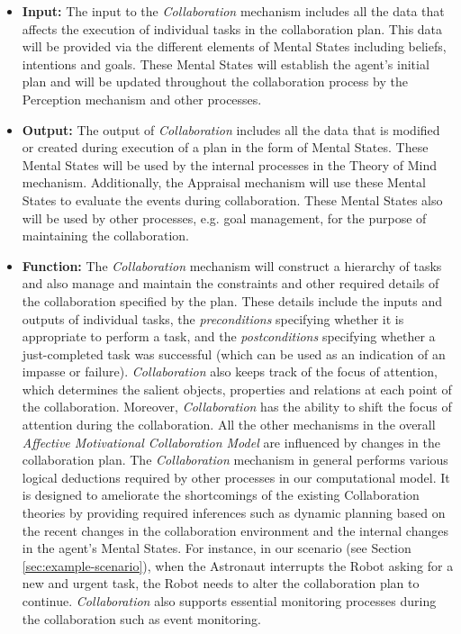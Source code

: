 \documentclass[12pt]{report}
\begin{document}
\begin{itemize}
  \item \textbf{Input:} The input to the \textit{Collaboration} mechanism
  includes all the data that affects the execution of individual tasks in the
  collaboration plan. This data will be provided via the different elements of
  Mental States including beliefs, intentions and goals. These Mental States
  will establish the agent's initial plan and will be updated throughout the
  collaboration process by the Perception mechanism and other processes.
  
  \item \textbf{Output:} The output of \textit{Collaboration} includes all the
  data that is modified or created during execution of a plan in the form of
  Mental States. These Mental States will be used by the internal processes in
  the Theory of Mind mechanism. Additionally, the Appraisal mechanism will use
  these Mental States to evaluate the events during collaboration. These Mental
  States also will be used by other processes, e.g. goal management, for the
  purpose of maintaining the collaboration.
  
  \item \textbf{Function:} The \textit{Collaboration} mechanism will construct a
  hierarchy of tasks and also manage and maintain the constraints and other
  required details of the collaboration specified by the plan. These details
  include the inputs and outputs of individual tasks, the \textit{preconditions}
  specifying whether it is appropriate to perform a task, and the
  \textit{postconditions} specifying whether a just-completed task was
  successful (which can be used as an indication of an impasse or failure).
  \textit{Collaboration} also keeps track of the focus of attention, which
  determines the salient objects, properties and relations at each point of the
  collaboration. Moreover, \textit{Collaboration} has the ability to shift the
  focus of attention during the collaboration. All the other mechanisms in the
  overall \textit{Affective Motivational Collaboration Model} are influenced by
  changes in the collaboration plan.
  The \textit{Collaboration} mechanism in general performs various logical
  deductions required by other processes in our computational model. It is
  designed to ameliorate the shortcomings of the existing Collaboration theories
  by providing required inferences such as dynamic planning based on the recent
  changes in the collaboration environment and the internal changes in the
  agent's Mental States. For instance, in our scenario (see Section
  \ref{sec:example-scenario}), when the Astronaut interrupts the Robot asking
  for a new and urgent task, the Robot needs to alter the collaboration plan to
  continue. \textit{Collaboration} also supports essential monitoring processes
  during the collaboration such as event monitoring.
\end{itemize}
\end{document}

